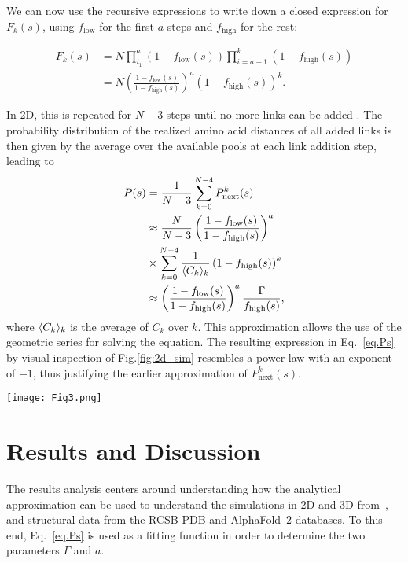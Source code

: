 \documentclass[
reprint,
twocolumn,
amsmath,amssymb,superscriptaddress,aps,
pre]{revtex4-1}
\DeclarePairedDelimiter{\evdel}{\langle}{\rangle}
\newcommand{\Pin}{P_{\mathrm{next}}}
\newcommand{\fhigh}{f_{\mathrm{high}}}
\newcommand{\flow}{f_{\mathrm{low}}}
\begin{document}
We can now use the recursive expressions to write down a closed expression for $F_k(s)$, using $\flow$ for the first $a$ steps and $\fhigh$ for the rest:

\begin{align}
    F_k(s)&=N\prod_{i_1}^a\left(1-\flow(s)\right)\prod_{i=a+1}^k\left(1-\fhigh(s)\right) \nonumber \\
    &= N\left(\frac{1-\flow(s)}{1-\fhigh(s)}\right)^a\left(1-\fhigh(s)\right)^{k}.
\end{align}

In 2D, this is repeated for $N-3$ steps until no more links can be added \cite{molkenthin2016scaling}.
The probability distribution of the realized amino acid distances of all added links is then given by the average over the available pools at each link addition step, leading to
\begin{align}
    P(s)&=\frac{1}{N-3}\sum_{k=0}^{N-4} \Pin^k(s) \nonumber \\
    &\approx \frac{N}{N-3}\left(\frac{1-\flow(s)}{1-\fhigh(s)}\right)^a \nonumber\\
&\times \sum_{k=0}^{N-4} \frac{1}{\evdel{C_k}_k} \left(1-\fhigh(s)\right)^{k} \nonumber \\
    &\approx \left(\frac{1-\flow(s)}{1-\fhigh(s)}\right)^a\frac{\Gamma}{\fhigh(s)},
    \label{eq.Ps}
\end{align}
where $\evdel{C_k}_k$ is the average of $C_k$ over $k$.
This approximation allows the use of the geometric series for solving the equation. 
The resulting expression in Eq.~\ref{eq.Ps} by visual inspection of Fig.\ref{fig:2d_sim} resembles a power law with an exponent of $-1$, thus justifying the earlier approximation of $\Pin^k(s)$.

 \begin{figure*}[htb]
        \centering
	\texttt{[image: Fig3.png]}
	    \caption{The analytical approximation fitted to amino acid distance distributions for a) 2D and b) 3D simulated data. Pink area shows the 95\% confidence interval. c) Example of a PCM taken from one of the 3D simulation runs. The pink squares indicate a contact between two nodes.}
        \label{fig:2d_sim}
\end{figure*}


\section{Results and Discussion}\label{sec:results}
The results analysis centers around understanding how the analytical approximation can be used to understand the simulations in 2D and 3D from~\cite{molkenthin2016scaling,molkenthin2020self}, and structural data from the RCSB PDB and AlphaFold~2 databases. To this end, Eq.~\ref{eq.Ps} is used as a fitting function in order to determine the two parameters $\Gamma$ and $a$.
\end{document}
